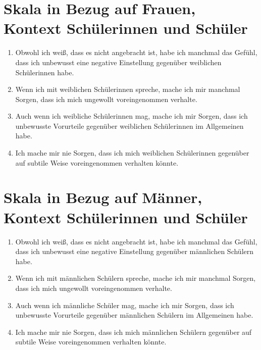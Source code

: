 \section*{Skala in Bezug auf Frauen, Kontext Schülerinnen und Schüler}
\label{app:skala-frauen-sus}

\begin{enumerate}
	\item Obwohl ich weiß, dass es nicht angebracht ist, habe ich manchmal das Gefühl, dass ich unbewusst eine negative Einstellung gegenüber weiblichen Schülerinnen habe.
	
	\item Wenn ich mit weiblichen Schülerinnen spreche, mache ich mir manchmal Sorgen, dass ich mich ungewollt voreingenommen verhalte.
	
	\item Auch wenn ich weibliche Schülerinnen mag, mache ich mir Sorgen, dass ich unbewusste Vorurteile gegenüber weiblichen Schülerinnen im Allgemeinen habe.
	
	\item Ich mache mir nie Sorgen, dass ich mich weiblichen Schülerinnen gegenüber auf subtile Weise voreingenommen verhalten könnte.
\end{enumerate}


\section*{Skala in Bezug auf Männer, Kontext Schülerinnen und Schüler}
\label{app:skala-maenner-sus}

\begin{enumerate}
	\item Obwohl ich weiß, dass es nicht angebracht ist, habe ich manchmal das Gefühl, dass ich unbewusst eine negative Einstellung gegenüber männlichen Schülern habe.
	
	\item Wenn ich mit männlichen Schülern spreche, mache ich mir manchmal Sorgen, dass ich mich ungewollt voreingenommen verhalte.
	
	\item Auch wenn ich männliche Schüler mag, mache ich mir Sorgen, dass ich unbewusste Vorurteile gegenüber männlichen Schülern im Allgemeinen habe.
	
	\item Ich mache mir nie Sorgen, dass ich mich männlichen Schülern gegenüber auf subtile Weise voreingenommen verhalten könnte.
\end{enumerate}


